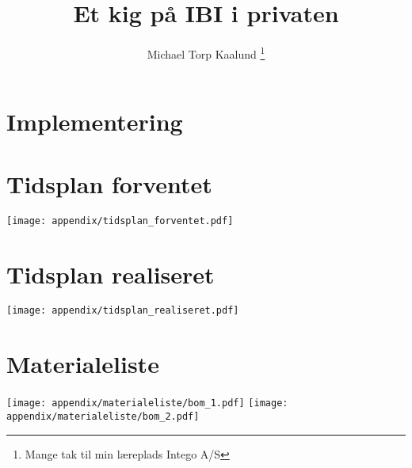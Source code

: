 \documentclass[12pt,a4paper,twoside]{article}
\title{Et kig på IBI i privaten}
\author{Michael Torp Kaalund \thanks{Mange tak til min læreplads Intego A/S}}
\begin{document}
  
    


    \tableofcontents

    

    \section{Implementering}
        
        
        

  

    \appendix
       
    \section{Tidsplan forventet} \label{sec:tidsplan_forventet}
    \texttt{[image: appendix/tidsplan\_forventet.pdf]}
    \section{Tidsplan realiseret} \label{sec:tidsplan_realiseret}
    \texttt{[image: appendix/tidsplan\_realiseret.pdf]}
    \section{Materialeliste} 
    \texttt{[image: appendix/materialeliste/bom\_1.pdf]}
    \newpage
    \texttt{[image: appendix/materialeliste/bom\_2.pdf]}
    
    
    
    
%    
\end{document}
